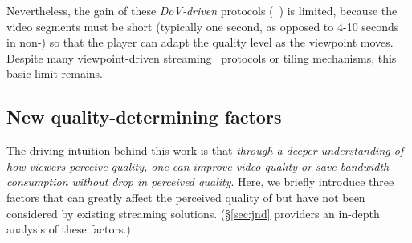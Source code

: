 Nevertheless, the gain of these {\em DoV-driven} protocols (\eg~\cite{??,??,??}) is limited, because the video segments must be short (typically one second, as opposed to 4-10 seconds in non-\vrvideos) so that the player can adapt the quality level as the viewpoint moves. 
Despite many viewpoint-driven streaming~\cite{??,??,??} protocols or tiling mechanisms, this basic limit remains.



%

\subsection{New quality-determining factors}
\label{subsec:opportunities}

The driving intuition behind this work is that {\em through a deeper understanding of how viewers perceive \vrvideo quality, one can improve video quality or save bandwidth consumption without drop in perceived quality}.
Here, we briefly introduce three factors that can greatly affect the perceived quality of \vrvideos but have not been considered by existing \vrvideo streaming solutions. (\S\ref{sec:jnd} providers an in-depth analysis of these factors.)

